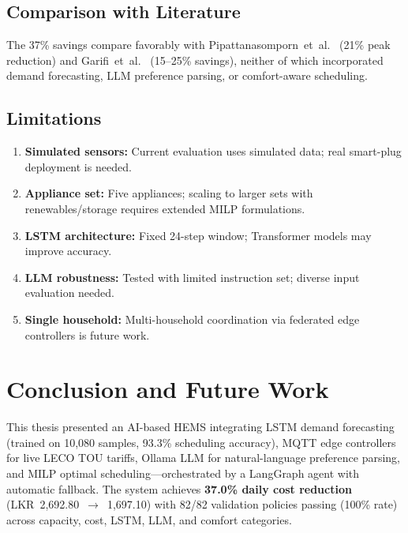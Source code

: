 \documentclass[10pt,a4paper,twocolumn]{article}
\begin{document}
\subsection{Comparison with Literature}
The 37\% savings compare favorably with Pipattanasomporn~et~al.~\cite{pipattanasomporn2012} (21\% peak reduction) and Garifi~et~al.~\cite{garifi2018} (15--25\% savings), neither of which incorporated demand forecasting, LLM preference parsing, or comfort-aware scheduling.

\subsection{Limitations}
\begin{enumerate}
    \item \textbf{Simulated sensors:} Current evaluation uses simulated data; real smart-plug deployment is needed.
    \item \textbf{Appliance set:} Five appliances; scaling to larger sets with renewables/storage requires extended MILP formulations.
    \item \textbf{LSTM architecture:} Fixed 24-step window; Transformer models may improve accuracy.
    \item \textbf{LLM robustness:} Tested with limited instruction set; diverse input evaluation needed.
    \item \textbf{Single household:} Multi-household coordination via federated edge controllers is future work.
\end{enumerate}

\section{Conclusion and Future Work}

This thesis presented an AI-based HEMS integrating LSTM demand forecasting (trained on 10,080 samples, 93.3\% scheduling accuracy), MQTT edge controllers for live LECO TOU tariffs, Ollama LLM for natural-language preference parsing, and MILP optimal scheduling---orchestrated by a LangGraph agent with automatic fallback. The system achieves \textbf{37.0\% daily cost reduction} (LKR~2,692.80~$\rightarrow$~1,697.10) with 82/82 validation policies passing (100\% rate) across capacity, cost, LSTM, LLM, and comfort categories.
\end{document}
